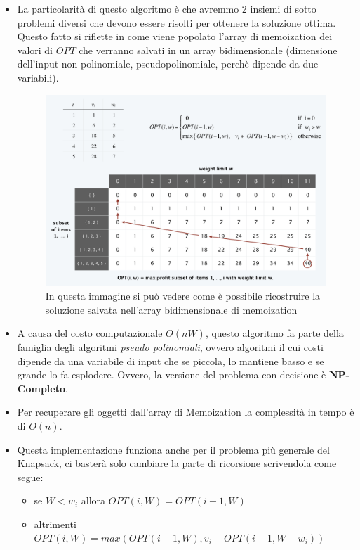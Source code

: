 \begin{itemize}
  \item
        La particolarità di questo algoritmo è che avremmo 2 insiemi di sotto
        problemi diversi che devono essere risolti per ottenere la soluzione
        ottima. Questo fatto si riflette in come viene popolato l'array di
        memoization dei valori di $OPT$ che verranno salvati in un array
        bidimensionale (dimensione dell'input non polinomiale,
        pseudopolinomiale, perchè dipende da due variabili).

        \begin{figure}[H]
          \includegraphics[width = 15cm]{Programmazione_dinamica/imgs/zaino1.png}
          \centering
          \caption{In questa immagine si può vedere come è possibile ricostruire la soluzione
            salvata nell'array bidimensionale di memoization}
        \end{figure}

  \item
        A causa del costo computazionale $O(nW)$, questo algoritmo fa parte
        della famiglia degli algoritmi \emph{pseudo polinomiali}, ovvero
        algoritmi il cui costi dipende da una variabile di input che se
        piccola, lo mantiene basso e se grande lo fa esplodere. Ovvero, la
        versione del problema con decisione è \textbf{NP-Completo}.
  \item
        Per recuperare gli oggetti dall'array di Memoization la complessità in
        tempo è di $O(n)$.
  \item
        Questa implementazione funziona anche per il problema più generale del
        Knapsack, ci basterà solo cambiare la parte di ricorsione scrivendola
        come segue:\\
        \begin{myblockquote}
          \begin{itemize}
            \item se $W < w_i$ allora $OPT(i, W) = OPT(i-1,W)$
            \item altrimenti $OPT(i, W) = max(OPT(i-1, W), v_i + OPT(i-1, W-w_i))$
          \end{itemize}
        \end{myblockquote}


\end{itemize}
